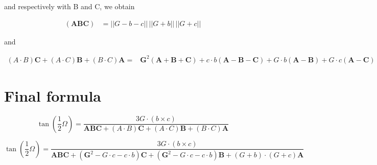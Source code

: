 \documentclass[10pt,a4paper]{article}
\begin{document}
and respectively with B and C, we obtain


\begin{align}
(\mathbf{A}\mathbf{B}\mathbf{C}) &= ||G-b-c||\,||G+b||\,||G+c||
\end{align}

and


\begin{align}
 \left({A}\cdot {B}\right)\mathbf{C}
  + \left({A}\cdot {C}\right)\mathbf{B}
   + \left({B}\cdot {C}\right)\mathbf{A}
	=& \mathbf{G}^2 (\mathbf{A} + \mathbf{B} + \mathbf{C})
	+ c \cdot b (\mathbf{A} - \mathbf{B} - \mathbf{C})
	 + G \cdot b (\mathbf{A} - \mathbf{B})
	  + G \cdot c (\mathbf{A} - \mathbf{C})
\end{align}


\section{Final formula}


$$
{\displaystyle \tan \left({\frac {1}{2}}\Omega \right)
  = {\frac {3 G \cdot \left( b \times c \right)}
    {\mathbf{A}\mathbf{B}\mathbf{C} + \left({A}\cdot {B}\right)\mathbf{C}
      + \left({A}\cdot {C}\right)\mathbf{B}
      + \left({B}\cdot {C}\right)\mathbf{A}}}}
$$


$$
{\displaystyle \tan \left({\frac {1}{2}}\Omega \right)
  = {\frac {3 G \cdot \left( b \times c \right)}
    {\mathbf{A}\mathbf{B}\mathbf{C} +
    (\mathbf{G}^2 - G \cdot c - c \cdot b)\mathbf{C}
      + (\mathbf{G}^2 - G \cdot c - c \cdot b)\mathbf{B}
      + \left( G + b \right) \cdot \left( G + c \right) \mathbf{A}
      }}}
$$
\end{document}
